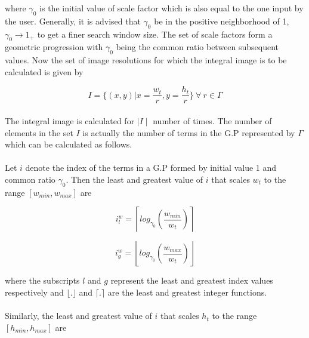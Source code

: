 where $\gamma_0$ is the initial value of scale factor which is also equal to the one input by the user. Generally, it is advised that $\gamma_0$ be in the positive neighborhood of 1, $\gamma_0 \rightarrow 1_+$ to get a finer search window size. The set of scale factors form a geometric progression with $\gamma_0$ being the common ratio between subsequent values. Now the set of image resolutions for which the integral image is to be calculated is given by 

\begin{equation}
I = \{ (x, y) | x = \frac{w_t}{r}, y = \frac{h_t}{r}\} \ \forall \ r \in \Gamma
\label{eq2}
\end{equation} 


\paragraph{}
The integral image is calculated for $\mid I \mid$ number of times. The number of elements in the set $I$ is actually the number of terms in the G.P represented by $\Gamma$ which can be calculated as follows.

\paragraph{}
Let $i$ denote the index of the terms in a G.P formed by initial value 1 and common ratio $\gamma_0$. Then the least and greatest value of $i$ that scales $w_t$ to the range $[w_{min}, w_{max}]$ are 

\begin{equation}
i^w_l = \left \lceil log_{\gamma_0} \left ( \frac{w_{min}}{w_t} \right ) \right \rceil
\label{eq3}
\end{equation}

\begin{equation}
i^w_g = \left \lfloor log_{\gamma_0} \left ( \frac{w_{max}}{w_t} \right ) \right \rfloor
\label{eq4}
\end{equation}

where the subscripts $l$ and $g$ represent the least and greatest index values respectively and $\lfloor.\rfloor$ and $\lceil.\rceil$ are the least and greatest integer functions.

\paragraph{}
Similarly, the least and greatest value of $i$ that scales $h_t$ to the range $[h_{min}, h_{max}]$ are 

